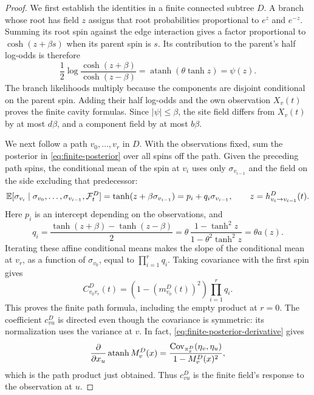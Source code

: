 \begin{proof}
We first establish the identities in a finite connected subtree \(D\).
A branch whose root has field \(z\) assigns that root probabilities
proportional to \(e^{z}\) and \(e^{-z}\).  Summing its root spin against
the edge interaction gives a factor proportional to
\(\cosh(z+\beta s)\) when its parent spin is \(s\).  Its contribution
to the parent's half log-odds is therefore
\[
 \frac12\log\frac{\cosh(z+\beta)}{\cosh(z-\beta)}
   =\operatorname{atanh}(\theta\tanh z)=\psi(z).
\]
The branch likelihoods multiply because the components are disjoint
conditional on the parent spin.  Adding their half log-odds and the
own observation \(X_v(t)\) proves the finite cavity formulas.
Since \(|\psi|\le\beta\), the site field differs from \(X_v(t)\) by at
most \(d\beta\), and a component field by at most \(b\beta\).

We next follow a path \(v_0,\ldots,v_r\) in \(D\).  With the observations
fixed, sum the posterior in \eqref{eq:finite-posterior} over all spins
off the path.  Given the preceding path spins, the conditional mean
of the spin at \(v_i\) uses only \(\sigma_{v_{i-1}}\) and the field on
the side excluding that predecessor:
\[
 \mathbb E[\sigma_{v_i}\mid \sigma_{v_0},\ldots,\sigma_{v_{i-1}},
                    \mathcal F_t^D]
   =\tanh(z+\beta\sigma_{v_{i-1}})
   =p_i+q_i\sigma_{v_{i-1}},
 \qquad z=h_{v_i\to v_{i-1}}^D(t).
\]
Here \(p_i\) is an intercept depending on the observations, and
\[
 q_i=\frac{\tanh(z+\beta)-\tanh(z-\beta)}{2}
     =\theta\,\frac{1-\tanh^2z}{1-\theta^2\tanh^2z}
     =\theta a(z).
\]
Iterating these affine conditional means makes the slope of the
conditional mean at \(v_r\), as a function of \(\sigma_{v_0}\),
equal to \(\prod_{i=1}^r q_i\).  Taking covariance with the first
spin gives
\[
 C_{v_0v_r}^D(t)
   =(1-(m_{v_0}^D(t))^2)\prod_{i=1}^r q_i.
\]
This proves the finite path formula, including the empty product at
\(r=0\).  The coefficient \(c_{vu}^D\) is directed even though the
covariance is symmetric: its normalization uses the variance at \(v\).
In fact, \eqref{eq:finite-posterior-derivative} gives
\[
 \frac{\partial}{\partial x_u}\operatorname{atanh}M_v^D(x)
   =\frac{\operatorname{Cov}_{\pi_x^D}(\eta_v,\eta_u)}
           {1-M_v^D(x)^2},
\]
which is the path product just obtained.  Thus \(c_{vu}^D\) is the
finite field's response to the observation at \(u\).


\end{proof}
